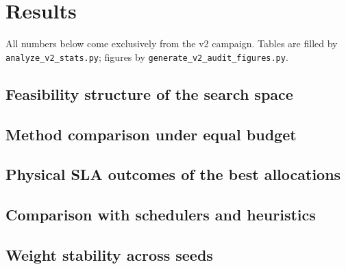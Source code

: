 \documentclass[conference]{IEEEtran}
\newif\ifdraftpending
\newcommand{\pending}[1]{%
  \ifdraftpending{\color{red}\textbf{[PENDING-v2: #1]}}\else{}\fi}
\begin{document}
\section{Results}
All numbers below come exclusively from the v2 campaign. Tables are filled by
\texttt{analyze\_v2\_stats.py}; figures by \texttt{generate\_v2\_audit\_figures.py}.

\subsection{Feasibility structure of the search space}
\pending{per scenario: fraction of evaluated candidates satisfying all hard
constraints; which constraint binds most often (expected: URLLC p99 under
congestion); whether any scenario has an empty feasible region after
calibration.}

\subsection{Method comparison under equal budget}
\pending{Table: best score per seed (mean$\pm$sd, median, CI95) per
method$\times$scenario; Friedman $\chi^2$/p per scenario; pairwise Wilcoxon
$p$ + effect sizes. Figures: per-seed dispersion strips; score bars.}

\pending{Convergence: evaluations to reach 95\% of final best, per method.}

\subsection{Physical SLA outcomes of the best allocations}
\pending{Table/figures: URLLC p99 and p99.9, deadline-violation rate,
worst-slice SLA, MTC PDR per method. Key question: does ANY method satisfy all
SLAs simultaneously, and at what load does that stop being possible?}

\subsection{Comparison with schedulers and heuristics}
\pending{best metaheuristic vs pure RR/PF/BCQI, slice-aware baselines, AQPS and
adaptive heuristics---same protocol, same seeds. Physical Pareto: total
throughput $\times$ URLLC p99.}

\subsection{Weight stability across seeds}
\pending{violin of best-candidate weights per slice across seeds; coefficient
of variation per scenario---whether the optimum is a property of the scenario
or of the noise realization.}
\end{document}
